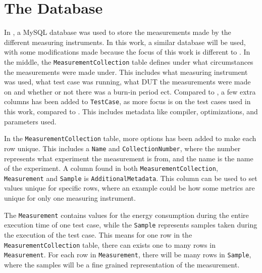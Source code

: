 \section{The Database}

In \cite{biksbois}, a MySQL database was used to store the measurements made by the different measuring instruments. In this work, a similar database will be used, with some modifications made because the focus of this work is different to \cite{biksbois}. In the middle, the \texttt{MeasurementCollection} table defines under what circumstances the measurements were made under. This includes what measuring instrument was used, what test case was running, what DUT the measurements were made on and whether or not there was a burn-in period ect. Compared to \cite{biksbois}, a few extra columns has been added to \texttt{TestCase}, as more focus is on the test cases used in this work, compared to \cite{biksbois}. This includes metadata like compiler, optimizations, and parameters used.


In the \texttt{MeasurementCollection} table, more options has been added to make each row unique. This includes a \texttt{Name} and \texttt{CollectionNumber}, where the number represents what experiment the measurement is from, and the name is the name of the experiment. A column found in both \texttt{MeasurementCollection}, \texttt{Measurement} and \texttt{Sample} is \texttt{AdditionalMetadata}. This column can be used to set values unique for specific rows, where an example could be how some metrics are unique for only one measuring instrument.


The \texttt{Measurement} contains values for the energy consumption during the entire execution time of one test case, while the \texttt{Sample} represents samples taken during the execution of the test case. This means for one row in the \texttt{MeasurementCollection} table, there can exists one to many rows in \texttt{Measurement}. For each row in \texttt{Measurement}, there will be many rows in \texttt{Sample}, where the samples will be a fine grained representation of the measurement.



